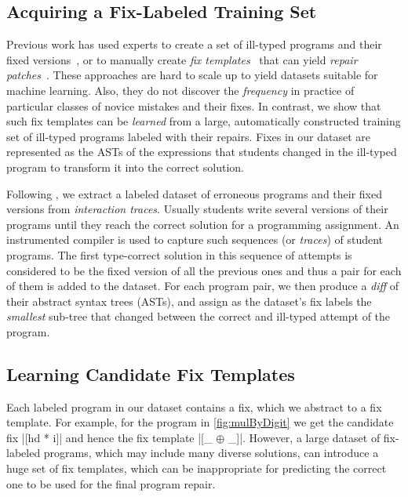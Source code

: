 \subsection{Acquiring a Fix-Labeled Training Set}
\label{sec:overview:data}

Previous work has used experts to create a set of ill-typed programs and their
fixed versions~\citep[][]{Lerner2007-dt, Loncaric2016-uk}, or to manually create
\emph{fix templates}~\cite{kim13par} that can yield \emph{repair
patches}~\citep[][]{martinez2013automatically,martinez2015mining}.
%
These approaches are hard to scale up to yield datasets suitable for machine
learning. Also, they do not discover the \emph{frequency} in practice of particular
classes of novice mistakes and their fixes.
%
In contrast, we show that such fix templates can be \emph{learned} from a large,
automatically constructed training set of ill-typed programs labeled with their
repairs.
%
Fixes in our dataset are represented as the ASTs of the expressions that students
changed in the ill-typed program to transform it into the correct solution.

Following \citep{Seidel:2017}, we extract a labeled
dataset of erroneous programs
and their fixed versions from \emph{interaction traces}. Usually students write
several versions of their programs until they reach the correct solution for a
programming assignment. An instrumented compiler is used to capture such
sequences (or \emph{traces}) of student programs. The first type-correct
solution in this sequence of attempts is considered to be the fixed
version of all the previous ones and thus a pair for each of them is added to
the dataset. For each program pair, we then produce a \emph{diff} of their
abstract syntax trees (ASTs), and assign as the dataset's fix labels the
\emph{smallest} sub-tree that changed between the correct and ill-typed attempt
of the program.


\subsection{Learning Candidate Fix Templates}
\label{sec:overview:learn}

Each labeled program in our dataset contains a fix, which we abstract to a fix
template. For example, for the \mbd program in \autoref{fig:mulByDigit} we get
the candidate fix |[hd * i]| and hence the fix template |[_ $\oplus$ _]|.
However, a large dataset of fix-labeled programs, which may include many diverse
solutions, can introduce a huge set of fix templates, which can be inappropriate
for predicting the correct one to be used for the final program repair.

